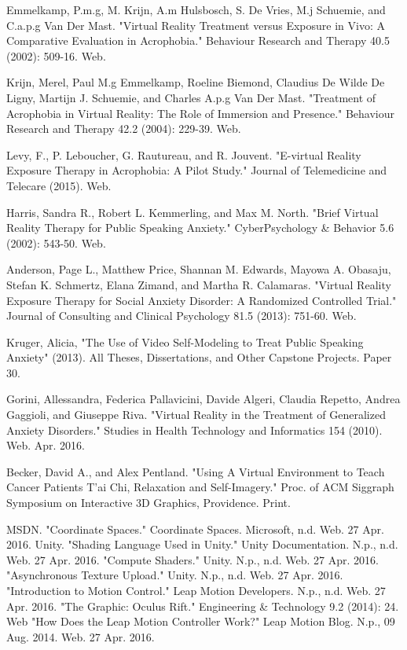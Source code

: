 \documentclass[a4paper,10pt]{article}
\begin{document}
\begin{thebibliography}{28}
Emmelkamp, P.m.g, M. Krijn, A.m Hulsbosch, S. De Vries, M.j Schuemie, and C.a.p.g Van Der Mast. "Virtual Reality Treatment versus Exposure in Vivo: A Comparative Evaluation in Acrophobia." Behaviour Research and Therapy 40.5 (2002): 509-16. Web.

	
Krijn, Merel, Paul M.g Emmelkamp, Roeline Biemond, Claudius De Wilde De Ligny, Martijn J. Schuemie, and Charles A.p.g Van Der Mast. "Treatment of Acrophobia in Virtual Reality: The Role of Immersion and Presence." Behaviour Research and Therapy 42.2 (2004): 229-39. Web.


Levy, F., P. Leboucher, G. Rautureau, and R. Jouvent. "E-virtual Reality Exposure Therapy in Acrophobia: A Pilot Study." Journal of Telemedicine and Telecare (2015). Web.
	
Harris, Sandra R., Robert L. Kemmerling, and Max M. North. "Brief Virtual Reality Therapy for Public Speaking Anxiety." CyberPsychology \& Behavior 5.6 (2002): 543-50. Web.


Anderson, Page L., Matthew Price, Shannan M. Edwards, Mayowa A. Obasaju, Stefan K. Schmertz, Elana Zimand, and Martha R. Calamaras. "Virtual Reality Exposure Therapy for Social Anxiety Disorder: A Randomized Controlled Trial." Journal of Consulting and Clinical Psychology 81.5 (2013): 751-60. Web.


Kruger, Alicia, "The Use of Video Self-Modeling to Treat Public Speaking Anxiety" (2013). All Theses, Dissertations, and Other Capstone Projects. Paper 30.


Gorini, Allessandra, Federica Pallavicini, Davide Algeri, Claudia Repetto, Andrea Gaggioli, and Giuseppe Riva. "Virtual Reality in the Treatment of Generalized Anxiety Disorders." Studies in Health Technology and Informatics 154 (2010). Web. Apr. 2016.

	
Becker, David A., and Alex Pentland. "Using A Virtual Environment to Teach Cancer Patients T'ai Chi, Relaxation and Self-Imagery." Proc. of ACM Siggraph Symposium on Interactive 3D Graphics, Providence. Print.
	
MSDN. "Coordinate Spaces." Coordinate Spaces. Microsoft, n.d. Web. 27 Apr. 2016.
Unity. "Shading Language Used in Unity." Unity Documentation. N.p., n.d. Web. 27 Apr. 2016.
"Compute Shaders." Unity. N.p., n.d. Web. 27 Apr. 2016.
"Asynchronous Texture Upload." Unity. N.p., n.d. Web. 27 Apr. 2016.
"Introduction to Motion Control." Leap Motion Developers. N.p., n.d. Web. 27 Apr. 2016. 
"The Graphic: Oculus Rift." Engineering \& Technology 9.2 (2014): 24. Web
"How Does the Leap Motion Controller Work?" Leap Motion Blog. N.p., 09 Aug. 2014. Web. 27 Apr. 2016.
\end{thebibliography}
\end{document}
